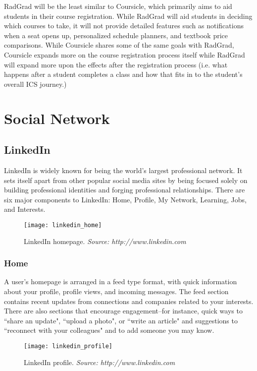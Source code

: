 RadGrad will be the least similar to Coursicle, which primarily aims to aid students in their course registration. While RadGrad will aid students in deciding which courses to take, it will not provide detailed features such as notifications when a seat opens up, personalized schedule planners, and textbook price comparisons. While Coursicle shares some of the same goals with RadGrad, Coursicle expands more on the course registration process itself while RadGrad will expand more upon the effects after the registration process (i.e. what happens after a student completes a class and how that fits in to the student's overall ICS journey.)

\section{Social Network}
\subsection{LinkedIn}
LinkedIn is widely known for being the world's largest professional network. It sets itself apart from other popular social media sites by being focused solely on building professional identities and forging professional relationships. There are six major components to LinkedIn: Home, Profile, My Network, Learning, Jobs, and Interests.

\begin{figure}[h]
\centering
\texttt{[image: linkedin\_home]}
\caption{LinkedIn homepage. \textit{Source: http://www.linkedin.com}}
\end{figure}

\subsubsection{Home}
A user's homepage is arranged in a feed type format, with quick information about your profile, profile views, and incoming messages. The feed section contains recent updates from connections and companies related to your interests. There are also sections that encourage engagement--for instance, quick ways to ``share an update", ``upload a photo", or ``write an article" and suggestions to ``reconnect with your colleagues" and to add someone you may know. 

\begin{figure}[h]
\centering
\texttt{[image: linkedin\_profile]}
\caption{LinkedIn profile. \textit{Source: http://www.linkedin.com}}
\end{figure}
